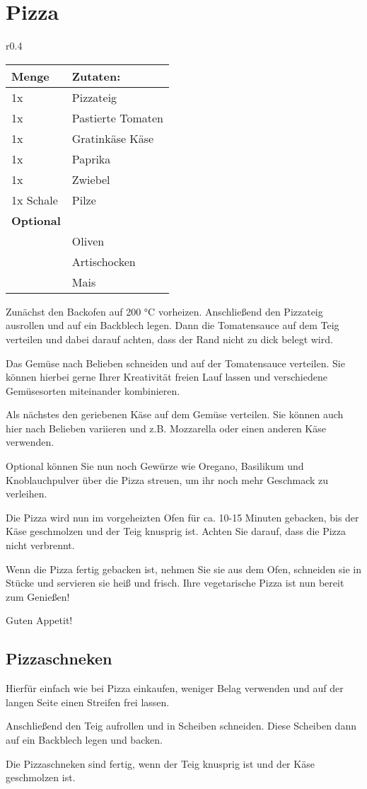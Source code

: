 \documentclass[../../book.tex]{subfiles}
\begin{document}
\section{Pizza}
\begin{wraptable}{r}{0.4\textwidth}
    \centering
    \begin{tabularx}{0.39\textwidth}{|l|X|}
        \hline
        Menge & Zutaten: \\
        \hline
        1x & Pizzateig \\
        \hline
        1x & Pastierte Tomaten \\
        \hline
        1x & Gratinkäse Käse\\
        \hline
        1x & Paprika\\
        \hline
        1x & Zwiebel\\
        \hline
        1x Schale & Pilze\\
        \hline
        \textbf{Optional} & \\
        \hline
        & Oliven\\
        \hline
        & Artischocken\\
        \hline
        & Mais\\
        \hline
    \end{tabularx}
\end{wraptable}
Zunächst den Backofen auf 200 °C vorheizen. Anschließend den Pizzateig ausrollen und auf ein Backblech legen. Dann die Tomatensauce auf dem Teig verteilen und dabei darauf achten, dass der Rand nicht zu dick belegt wird.

Das Gemüse nach Belieben schneiden und auf der Tomatensauce verteilen. Sie können hierbei gerne Ihrer Kreativität freien Lauf lassen und verschiedene Gemüsesorten miteinander kombinieren.

Als nächstes den geriebenen Käse auf dem Gemüse verteilen. Sie können auch hier nach Belieben variieren und z.B. Mozzarella oder einen anderen Käse verwenden.

Optional können Sie nun noch Gewürze wie Oregano, Basilikum und Knoblauchpulver über die Pizza streuen, um ihr noch mehr Geschmack zu verleihen.

Die Pizza wird nun im vorgeheizten Ofen für ca. 10-15 Minuten gebacken, bis der Käse geschmolzen und der Teig knusprig ist. Achten Sie darauf, dass die Pizza nicht verbrennt.

Wenn die Pizza fertig gebacken ist, nehmen Sie sie aus dem Ofen, schneiden sie in Stücke und servieren sie heiß und frisch. Ihre vegetarische Pizza ist nun bereit zum Genießen!

Guten Appetit!
\subsection{Pizzaschneken}

Hierfür einfach wie bei Pizza einkaufen, weniger Belag verwenden und auf der langen Seite einen Streifen frei lassen.

Anschließend den Teig aufrollen und in Scheiben schneiden. Diese Scheiben dann auf ein Backblech legen und backen.

Die Pizzaschneken sind fertig, wenn der Teig knusprig ist und der Käse geschmolzen ist.

\newpage
\end{document}
